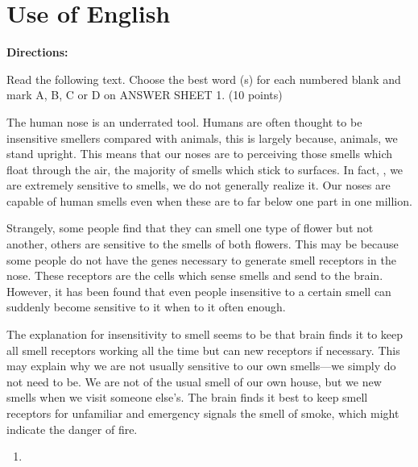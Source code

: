 




\section{Use of English}

\noindent
\textbf{Directions:}\\
{Read the following text. Choose the best word (s) for each
	numbered blank and mark A, B, C or D on ANSWER
	SHEET 1. (10 points)


\TiGanSpace


The human nose is an underrated tool. Humans are often thought to be
insensitive smellers compared with animals, \cloze this is
largely because, \cloze animals, we stand upright. This means that
our noses are \cloze to perceiving those smells which float
through the air, \cloze the majority of smells which stick to
surfaces. In fact, \cloze , we are extremely sensitive to
smells, \cloze we do not generally realize it. Our noses are
capable of \cloze human smells even when these
are \cloze to far below one part in one million.

Strangely, some people find that they can smell one type of flower but
not another, \cloze others are sensitive to the smells of both
flowers. This may be because some people do not have the genes necessary
to generate \cloze smell receptors in the nose. These receptors
are the cells which sense smells and send \cloze to the brain.
However, it has been found that even people insensitive to a certain
smell \cloze can suddenly become sensitive to it
when \cloze to it often enough.

The explanation for insensitivity to smell seems to be that brain finds
it \cloze to keep all smell receptors working all the time but
can \cloze new receptors if necessary. This
may \cloze explain why we are not usually sensitive to our own
smells---we simply do not need to be. We are not \cloze of the
usual smell of our own house, but we \cloze new smells when we
visit someone else's. The brain finds it best to keep smell
receptors \cloze for unfamiliar and emergency
signals \cloze the smell of smoke, which might indicate the
danger of fire.


\newpage

\begin{enumerate}
	\item



\end{enumerate}}
